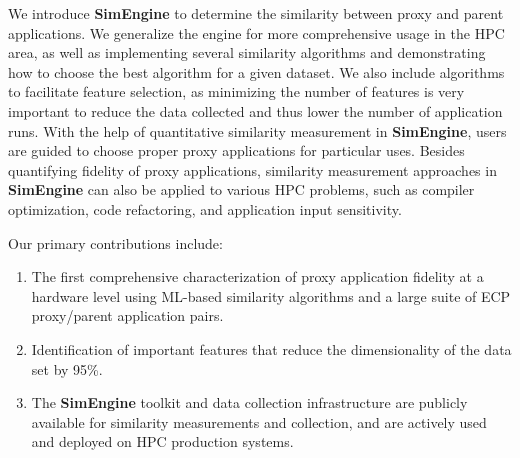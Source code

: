 \documentclass[conference]{IEEEtran}
\newcommand{\us}{\textbf{SimEngine}\xspace}
\newcommand{\todo}[1]           {\textcolor{red}{[TODO:#1]}}
\begin{document}
We introduce \us to determine the similarity between proxy and parent applications. We generalize the engine for more comprehensive usage in the HPC area, as well as implementing several similarity algorithms and demonstrating how to choose the best algorithm for a given dataset. We also include algorithms to facilitate feature selection, as minimizing the number of features is very important to reduce the data collected and thus lower the number of application runs.
With the help of quantitative similarity measurement in \us, users are guided to choose proper proxy applications for particular uses. Besides quantifying fidelity of proxy applications, similarity measurement approaches in \us can also be applied to various HPC problems, such as compiler optimization, code refactoring, and application input sensitivity.


Our primary contributions include:
\begin{enumerate}
    \item The first comprehensive characterization of proxy application fidelity at a hardware level using ML-based similarity algorithms and a large suite of ECP proxy/parent application pairs. %
    \item 
    Identification of important features that reduce the dimensionality of the data set by 95\%.
    \item The \us toolkit and data collection infrastructure are publicly available for similarity measurements and collection, and are actively used and deployed on HPC production systems. %
\end{enumerate}
\end{document}
